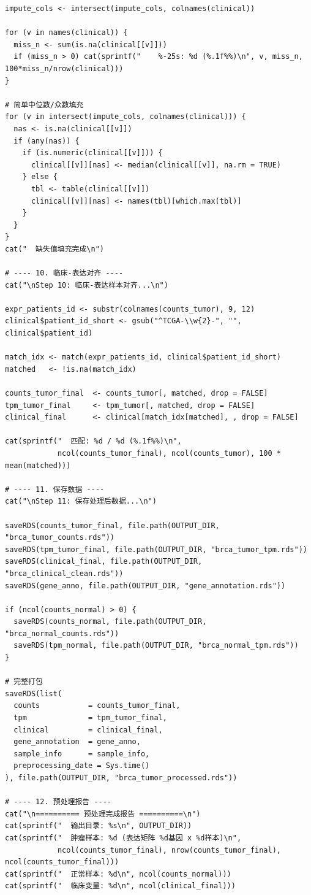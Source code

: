 \documentclass[12pt,a4paper]{ctexart}
\begin{document}
\begin{lstlisting}[caption={01_data_preprocessing}, basicstyle=\ttfamily\scriptsize]
impute_cols <- intersect(impute_cols, colnames(clinical))

for (v in names(clinical)) {
  miss_n <- sum(is.na(clinical[[v]]))
  if (miss_n > 0) cat(sprintf("    %-25s: %d (%.1f%%)\n", v, miss_n, 100*miss_n/nrow(clinical)))
}

# 简单中位数/众数填充
for (v in intersect(impute_cols, colnames(clinical))) {
  nas <- is.na(clinical[[v]])
  if (any(nas)) {
    if (is.numeric(clinical[[v]])) {
      clinical[[v]][nas] <- median(clinical[[v]], na.rm = TRUE)
    } else {
      tbl <- table(clinical[[v]])
      clinical[[v]][nas] <- names(tbl)[which.max(tbl)]
    }
  }
}
cat("  缺失值填充完成\n")

# ---- 10. 临床-表达对齐 ----
cat("\nStep 10: 临床-表达样本对齐...\n")

expr_patients_id <- substr(colnames(counts_tumor), 9, 12)
clinical$patient_id_short <- gsub("^TCGA-\\w{2}-", "", clinical$patient_id)

match_idx <- match(expr_patients_id, clinical$patient_id_short)
matched   <- !is.na(match_idx)

counts_tumor_final  <- counts_tumor[, matched, drop = FALSE]
tpm_tumor_final     <- tpm_tumor[, matched, drop = FALSE]
clinical_final      <- clinical[match_idx[matched], , drop = FALSE]

cat(sprintf("  匹配: %d / %d (%.1f%%)\n",
            ncol(counts_tumor_final), ncol(counts_tumor), 100 * mean(matched)))

# ---- 11. 保存数据 ----
cat("\nStep 11: 保存处理后数据...\n")

saveRDS(counts_tumor_final, file.path(OUTPUT_DIR, "brca_tumor_counts.rds"))
saveRDS(tpm_tumor_final, file.path(OUTPUT_DIR, "brca_tumor_tpm.rds"))
saveRDS(clinical_final, file.path(OUTPUT_DIR, "brca_clinical_clean.rds"))
saveRDS(gene_anno, file.path(OUTPUT_DIR, "gene_annotation.rds"))

if (ncol(counts_normal) > 0) {
  saveRDS(counts_normal, file.path(OUTPUT_DIR, "brca_normal_counts.rds"))
  saveRDS(tpm_normal, file.path(OUTPUT_DIR, "brca_normal_tpm.rds"))
}

# 完整打包
saveRDS(list(
  counts           = counts_tumor_final,
  tpm              = tpm_tumor_final,
  clinical         = clinical_final,
  gene_annotation  = gene_anno,
  sample_info      = sample_info,
  preprocessing_date = Sys.time()
), file.path(OUTPUT_DIR, "brca_tumor_processed.rds"))

# ---- 12. 预处理报告 ----
cat("\n========== 预处理完成报告 ==========\n")
cat(sprintf("  输出目录: %s\n", OUTPUT_DIR))
cat(sprintf("  肿瘤样本: %d (表达矩阵 %d基因 x %d样本)\n",
            ncol(counts_tumor_final), nrow(counts_tumor_final), ncol(counts_tumor_final)))
cat(sprintf("  正常样本: %d\n", ncol(counts_normal)))
cat(sprintf("  临床变量: %d\n", ncol(clinical_final)))


\end{lstlisting}
\end{document}
